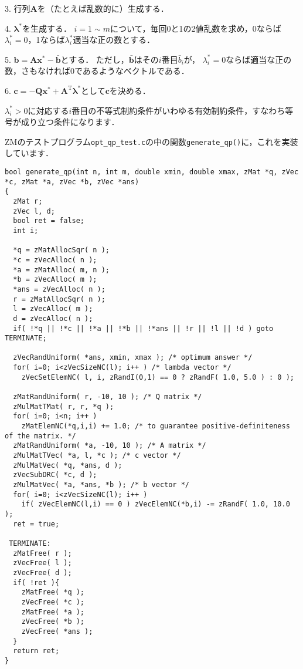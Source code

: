 ﻿\documentclass[a4paper]{jsarticle}
\begin{document}
3. 行列$\boldsymbol{A}$を（たとえば乱数的に）生成する．

4. $\boldsymbol{\lambda}^{*}$を生成する．
$i=1\sim m$について，毎回0と1の2値乱数を求め，0ならば$\lambda_{i}^{*}=0$，1ならば$\lambda_{i}^{*}$適当な正の数とする．

5. $\boldsymbol{b}=\boldsymbol{A}\boldsymbol{x}^{*}-\bar{\boldsymbol{b}}$とする．
ただし，$\bar{\boldsymbol{b}}$はその$i$番目$\bar{b}_{i}$が，
$\lambda_{i}^{*}=0$ならば適当な正の数，さもなければ0であるようなベクトルである．

6. $\boldsymbol{c}=-\boldsymbol{Q}\boldsymbol{x}^{*}+\boldsymbol{A}^{\mathrm{T}}\boldsymbol{\lambda}^{*}$として$\boldsymbol{c}$を決める．

$\lambda_{i}^{*}>0$に対応する$i$番目の不等式制約条件がいわゆる有効制約条件，すなわち等号が成り立つ条件になります．


ZMのテストプログラム\verb|opt_qp_test.c|の中の関数\verb|generate_qp()|に，これを実装しています．
\begin{verbatim}
bool generate_qp(int n, int m, double xmin, double xmax, zMat *q, zVec *c, zMat *a, zVec *b, zVec *ans)
{
  zMat r;
  zVec l, d;
  bool ret = false;
  int i;

  *q = zMatAllocSqr( n );
  *c = zVecAlloc( n );
  *a = zMatAlloc( m, n );
  *b = zVecAlloc( m );
  *ans = zVecAlloc( n );
  r = zMatAllocSqr( n );
  l = zVecAlloc( m );
  d = zVecAlloc( n );
  if( !*q || !*c || !*a || !*b || !*ans || !r || !l || !d ) goto TERMINATE;

  zVecRandUniform( *ans, xmin, xmax ); /* optimum answer */
  for( i=0; i<zVecSizeNC(l); i++ ) /* lambda vector */
    zVecSetElemNC( l, i, zRandI(0,1) == 0 ? zRandF( 1.0, 5.0 ) : 0 );

  zMatRandUniform( r, -10, 10 ); /* Q matrix */
  zMulMatTMat( r, r, *q );
  for( i=0; i<n; i++ )
    zMatElemNC(*q,i,i) += 1.0; /* to guarantee positive-definiteness of the matrix. */
  zMatRandUniform( *a, -10, 10 ); /* A matrix */
  zMulMatTVec( *a, l, *c ); /* c vector */
  zMulMatVec( *q, *ans, d );
  zVecSubDRC( *c, d );
  zMulMatVec( *a, *ans, *b ); /* b vector */
  for( i=0; i<zVecSizeNC(l); i++ )
    if( zVecElemNC(l,i) == 0 ) zVecElemNC(*b,i) -= zRandF( 1.0, 10.0 );
  ret = true;

 TERMINATE:
  zMatFree( r );
  zVecFree( l );
  zVecFree( d );
  if( !ret ){
    zMatFree( *q );
    zVecFree( *c );
    zMatFree( *a );
    zVecFree( *b );
    zVecFree( *ans );
  }
  return ret;
}
\end{verbatim}
\end{document}
